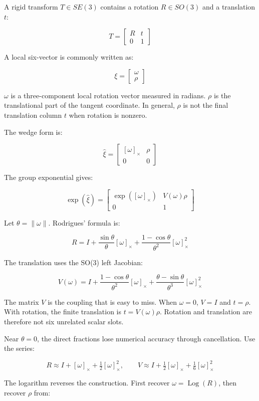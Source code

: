 A rigid transform \(T\in SE(3)\) contains a rotation \(R\in SO(3)\) and a translation \(t\):

\[
T=\begin{bmatrix}R&t\\0&1\end{bmatrix}
\]

A local six-vector is commonly written as:

\[
\xi=\begin{bmatrix}\omega\\\rho\end{bmatrix}
\]

\(\omega\) is a three-component local rotation vector measured in radians. \(\rho\) is the translational part of the tangent coordinate. In general, \(\rho\) is not the final translation column \(t\) when rotation is nonzero.

The wedge form is:

\[
\widehat{\xi}=\begin{bmatrix}[\omega]_\times&\rho\\0&0\end{bmatrix}
\]

The group exponential gives:

\[
\exp(\widehat{\xi})=\begin{bmatrix}\exp([\omega]_\times)&V(\omega)\rho\\0&1\end{bmatrix}
\]

Let \(\theta=\lVert\omega\rVert\). Rodrigues' formula is:

\[
R=I+\frac{\sin\theta}{\theta}[\omega]_\times+
\frac{1-\cos\theta}{\theta^2}[\omega]_\times^2
\]

The translation uses the SO(3) left Jacobian:

\[
V(\omega)=I+\frac{1-\cos\theta}{\theta^2}[\omega]_\times+
\frac{\theta-\sin\theta}{\theta^3}[\omega]_\times^2
\]

The matrix \(V\) is the coupling that is easy to miss. When \(\omega=0\), \(V=I\) and \(t=\rho\). With rotation, the finite translation is \(t=V(\omega)\rho\). Rotation and translation are therefore not six unrelated scalar slots.

Near \(\theta=0\), the direct fractions lose numerical accuracy through cancellation. Use the series:

\[
R\approx I+[\omega]_\times+\tfrac12[\omega]_\times^2,
\qquad
V\approx I+\tfrac12[\omega]_\times+\tfrac16[\omega]_\times^2
\]

The logarithm reverses the construction. First recover \(\omega=\operatorname{Log}(R)\), then recover \(\rho\) from:

